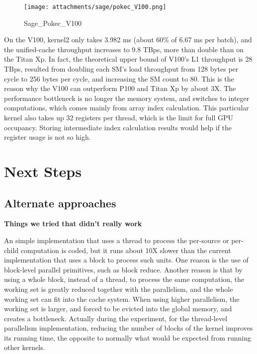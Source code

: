 \documentclass[10pt,oneside]{memoir}
\begin{document}
\begin{figure}
\centering
\texttt{[image: attachments/sage/pokec\_V100.png]}
\caption{Sage\_Pokec\_V100}
\end{figure}

On the V100, kernel2 only takes 3.982 ms (about 60\% of 6.67 ms per
batch), and the unified-cache throughput increases to 9.8 TBps, more
than double than on the Titan Xp. In fact, the theoretical upper bound
of V100's L1 throughput is 28 TBps, resulted from doubling each SM's
load throughput from 128 bytes per cycle to 256 bytes per cycle, and
increasing the SM count to 80. This is the reason why the V100 can
outperform P100 and Titan Xp by about 3X. The performance bottleneck is
no longer the memory system, and switches to integer computations, which
comes mainly from array index calculation. This particular kernel also
takes up 32 registers per thread, which is the limit for full GPU
occupancy. Storing intermediate index calculation results would help if
the register usage is not so high.

\hypertarget{next-steps-2}{%
\section{Next Steps}\label{next-steps-2}}

\hypertarget{alternate-approaches-1}{%
\subsection{Alternate approaches}\label{alternate-approaches-1}}

\textbf{Things we tried that didn't really work}

An simple implementation that uses a thread to process the per-source or
per-child computation is coded, but it runs about 10X slower than the
current implementation that uses a block to process such units. One
reason is the use of block-level parallel primitives, such as block
reduce. Another reason is that by using a whole block, instead of a
thread, to process the same computation, the working set is greatly
reduced together with the parallelism, and the whole working set can fit
into the cache system. When using higher parallelism, the working set is
larger, and forced to be evicted into the global memory, and creates a
bottleneck. Actually during the experiment, for the thread-level
parallelism implementation, reducing the number of blocks of the kernel
improves its running time, the opposite to normally what would be
expected from running other kernels.
\end{document}
